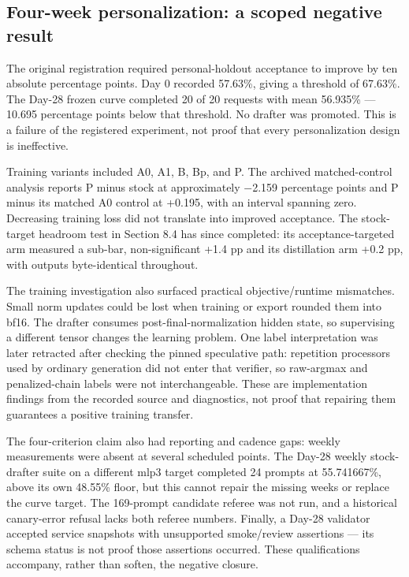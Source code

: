 \documentclass[
  11pt,
]{article}
\begin{document}
\subsection{Four-week personalization: a scoped negative
result}\label{four-week-personalization-a-scoped-negative-result}

The original registration required personal-holdout acceptance to
improve by ten absolute percentage points. Day 0 recorded 57.63\%,
giving a threshold of 67.63\%. The Day-28 frozen curve completed 20 of
20 requests with mean 56.935\% --- 10.695 percentage points below that
threshold. No drafter was promoted. This is a failure of the registered
experiment, not proof that every personalization design is ineffective.

Training variants included A0, A1, B, Bp, and P. The archived
matched-control analysis reports P minus stock at approximately −2.159
percentage points and P minus its matched A0 control at +0.195, with an
interval spanning zero. Decreasing training loss did not translate into
improved acceptance. The stock-target headroom test in Section 8.4 has
since completed: its acceptance-targeted arm measured a sub-bar,
non-significant +1.4 pp and its distillation arm +0.2 pp, with outputs
byte-identical throughout.

The training investigation also surfaced practical objective/runtime
mismatches. Small norm updates could be lost when training or export
rounded them into bf16. The drafter consumes post-final-normalization
hidden state, so supervising a different tensor changes the learning
problem. One label interpretation was later retracted after checking the
pinned speculative path: repetition processors used by ordinary
generation did not enter that verifier, so raw-argmax and
penalized-chain labels were not interchangeable. These are
implementation findings from the recorded source and diagnostics, not
proof that repairing them guarantees a positive training transfer.

The four-criterion claim also had reporting and cadence gaps: weekly
measurements were absent at several scheduled points. The Day-28 weekly
stock-drafter suite on a different mlp3 target completed 24 prompts at
55.741667\%, above its own 48.55\% floor, but this cannot repair the
missing weeks or replace the curve target. The 169-prompt candidate
referee was not run, and a historical canary-error refusal lacks both
referee numbers. Finally, a Day-28 validator accepted service snapshots
with unsupported smoke/review assertions --- its schema status is not
proof those assertions occurred. These qualifications accompany, rather
than soften, the negative closure.
\end{document}
